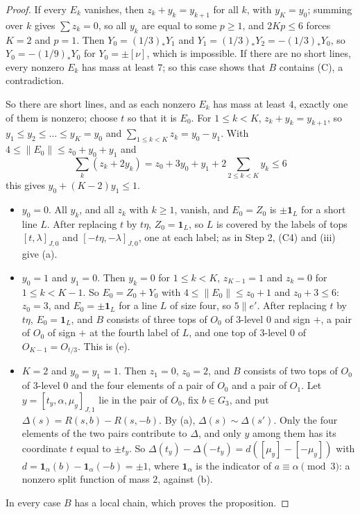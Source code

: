 \begin{proof}
If every $E_{k}$ vanishes, then $z_{k}+y_{k}=y_{k+1}$ for all $k$, with
$y_{K}=y_{0}$; summing over $k$ gives $\sum z_{k}=0$, so all $y_{k}$ are
equal to some $p\ge1$, and $2Kp\le6$ forces $K=2$ and $p=1$. Then
$Y_{0}=(1/3)_{*}Y_{1}$ and $Y_{1}=(1/3)_{*}Y_{2}=-(1/3)_{*}Y_{0}$, so
$Y_{0}=-(1/9)_{*}Y_{0}$ for $Y_{0}=\pm[\nu]$, which is impossible. If there
are no short lines, every nonzero $E_{k}$ has mass at least $7$; so this
case shows that $B$ contains (C), a contradiction.

So there are short lines, and as each nonzero $E_{k}$ has mass at least
$4$, exactly one of them is nonzero; choose $t$ so that it is $E_{0}$. For
$1\le k<K$, $z_{k}+y_{k}=y_{k+1}$, so $y_{1}\le y_{2}\le\dots\le y_{K}=y_{0}$
and $\sum_{1\le k<K}z_{k}=y_{0}-y_{1}$. With $4\le\|E_{0}\|\le
z_{0}+y_{0}+y_{1}$ and
\[
  \sum_{k}(z_{k}+2y_{k})=z_{0}+3y_{0}+y_{1}+2\sum_{2\le k<K}y_{k}\le6
\]
this gives $y_{0}+(K-2)y_{1}\le1$.
\begin{itemize}
\item $y_{0}=0$. All $y_{k}$, and all $z_{k}$ with $k\ge1$, vanish, and
$E_{0}=Z_{0}$ is $\pm\mathbf 1_{L}$ for a short line $L$. After replacing $t$
by $t\eta$, $Z_{0}=\mathbf 1_{L}$, so $L$ is covered by the labels of tops
$[t,\lambda]_{J,0}$ and $[-t\eta,-\lambda]_{J,0}$, one at each label; as in
Step 2, (C4) and (iii) give (a).
\item $y_{0}=1$ and $y_{1}=0$. Then $y_{k}=0$ for $1\le k<K$, $z_{K-1}=1$
and $z_{k}=0$ for $1\le k<K-1$. So $E_{0}=Z_{0}+Y_{0}$ with
$4\le\|E_{0}\|\le z_{0}+1$ and $z_{0}+3\le6$: $z_{0}=3$, and
$E_{0}=\pm\mathbf 1_{L}$ for a line $L$ of size four, so $5\parallel e'$.
After replacing $t$ by $t\eta$, $E_{0}=\mathbf 1_{L}$, and $B$ consists of
three tops of $O_{0}$ of $3$-level $0$ and sign $+$, a pair of $O_{0}$ of
sign $+$ at the fourth label of $L$, and one top of $3$-level $0$ of
$O_{K-1}=O_{t/3}$. This is (e).
\item $K=2$ and $y_{0}=y_{1}=1$. Then $z_{1}=0$, $z_{0}=2$, and $B$
consists of two tops of $O_{0}$ of $3$-level $0$ and the four elements of a
pair of $O_{0}$ and a pair of $O_{1}$. Let $y=[t_{y},\alpha,\mu_{y}]_{J,1}$
lie in the pair of $O_{0}$, fix $b\in G_{3}$, and put
$\Delta(s)=R(s,b)-R(s,-b)$. By (a), $\Delta(s)\sim
\Delta(s')$. Only the four elements of the two pairs contribute to $\Delta$,
and only $y$ among them has its coordinate $t$ equal to $\pm t_{y}$. So
$\Delta(t_{y})-\Delta(-t_{y})=d([\mu_{y}]-[-\mu_{y}])$ with $d=\mathbf
1_{\alpha}(b)-\mathbf 1_{\alpha}(-b)=\pm1$, where $\mathbf 1_{\alpha}$ is the
indicator of $a\equiv\alpha\pmod3$: a nonzero split function of mass $2$,
against (b).
\end{itemize}
In every case $B$ has a local chain, which proves the proposition.
\end{proof}

